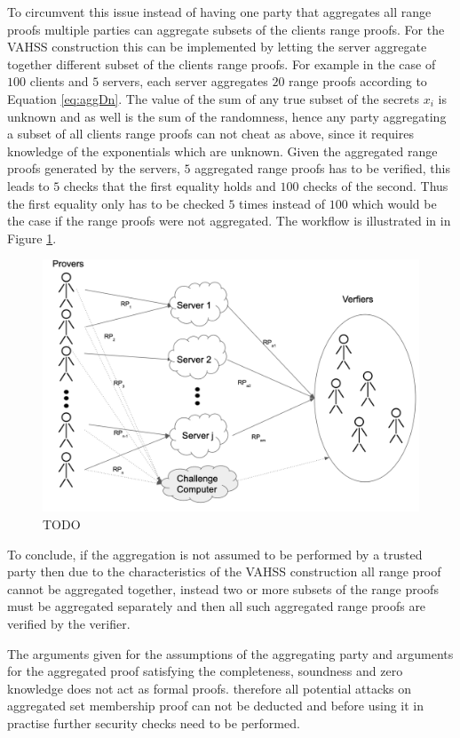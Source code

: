 To circumvent this issue instead of having one party that aggregates all range proofs multiple parties can aggregate subsets of the clients range proofs. For the VAHSS construction this can be implemented by letting the server aggregate together different subset of the clients range proofs. For example in the case of $100$ clients and $5$ servers, each server aggregates $20$ range proofs according to Equation \eqref{eq:aggDn}. The value of the sum of any true subset of the secrets $x_i$ is unknown and as well is the sum of the randomness, hence any party aggregating a subset of all clients range proofs can not cheat as above, since it requires knowledge of the exponentials which are unknown.  Given the aggregated range proofs generated by the servers, $5$ aggregated range proofs has to be verified, this leads to $5$ checks that the first equality holds and $100$ checks of the second. Thus the first equality only has to be checked $5$ times instead of $100$ which would be the case if the range proofs were not aggregated. 
The workflow is illustrated in in Figure \ref{fig:workflow}.

 \begin{figure}[]
\caption{TODO}
\label{fig:workflow}
\includegraphics[width=\linewidth]{./figure/workflow_challanger.png}
\end{figure}
To conclude, if the aggregation is not assumed to be performed by a trusted party then due to the characteristics of the VAHSS construction all range proof cannot be aggregated together, instead two or more subsets of the range proofs must be aggregated separately and then all such aggregated range proofs are verified by the verifier. 

The arguments given for the assumptions of the aggregating party and arguments for the aggregated proof satisfying the completeness, soundness and zero knowledge  does not act as formal proofs. therefore all potential attacks on aggregated set membership proof can not be deducted and before using it in practise further security checks need to be performed. 





